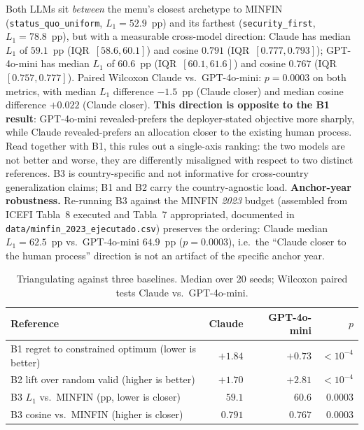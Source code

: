 \documentclass[conference]{IEEEtran}
\begin{document}
Both LLMs sit \emph{between} the menu's closest archetype to MINFIN
(\texttt{status\_quo\_uniform}, $L_1{=}52.9$~pp) and its farthest
(\texttt{security\_first}, $L_1{=}78.8$~pp), but with a measurable
cross-model direction: Claude has median $L_1$ of $59.1$~pp
(IQR~$[58.6, 60.1]$) and cosine $0.791$ (IQR~$[0.777, 0.793]$);
GPT-4o-mini has median $L_1$ of $60.6$~pp (IQR~$[60.1, 61.6]$) and
cosine $0.767$ (IQR~$[0.757, 0.777]$). Paired Wilcoxon Claude vs.\
GPT-4o-mini: $p{=}0.0003$ on both metrics, with median $L_1$ difference
$-1.5$~pp (Claude closer) and median cosine difference $+0.022$
(Claude closer). \textbf{This direction is opposite to the B1 result}:
GPT-4o-mini revealed-prefers the deployer-stated objective more
sharply, while Claude revealed-prefers an allocation closer to the
existing human process. Read together with B1, this rules out a
single-axis ranking: the two models are not better and worse, they
are differently misaligned with respect to two distinct references.
B3 is country-specific and not informative for cross-country
generalization claims; B1 and B2 carry the country-agnostic load.
\textbf{Anchor-year robustness.} Re-running B3 against the MINFIN
\emph{2023} budget (assembled from ICEFI Tabla~8 executed and Tabla~7
appropriated, documented in \texttt{data/minfin\_2023\_ejecutado.csv})
preserves the ordering: Claude median $L_1{=}62.5$~pp vs.\ GPT-4o-mini
$64.9$~pp ($p{=}0.0003$), i.e.\ the ``Claude closer to the human
process'' direction is not an artifact of the specific anchor year.

\begin{table}[h]
\centering
\caption{Triangulating against three baselines. Median over 20 seeds; Wilcoxon paired tests Claude vs.\ GPT-4o-mini.}
\label{tab:baselines}
\begin{tabular}{lrrr}
\toprule
Reference & Claude & GPT-4o-mini & $p$ \\
\midrule
B1 regret to constrained optimum (lower is better) & $+1.84$ & $+0.73$ & $<10^{-4}$ \\
B2 lift over random valid (higher is better)        & $+1.70$ & $+2.81$ & $<10^{-4}$ \\
B3 $L_1$ vs.\ MINFIN (pp, lower is closer)          & $59.1$ & $60.6$ & $0.0003$ \\
B3 cosine vs.\ MINFIN (higher is closer)            & $0.791$ & $0.767$ & $0.0003$ \\
\bottomrule
\end{tabular}
\end{table}
\end{document}
